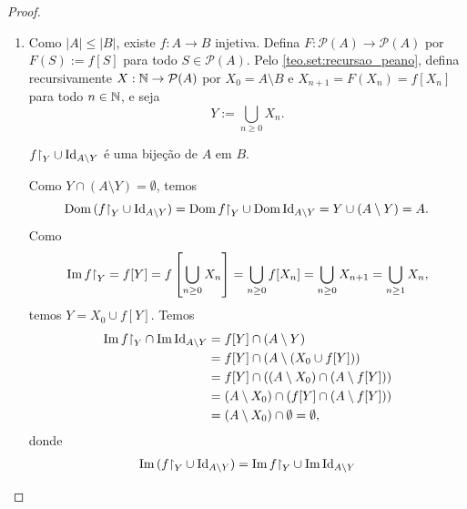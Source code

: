 \begin{proof}
    \leavevmode
        \begin{enumerate}[leftmargin=*, align=left, label=\textbf{(\alph*)}]
            \item Como $|A| \leq |B|$, existe $f : A \to B$ injetiva. Defina $F : \mathcal{P}(A) \to \mathcal{P}(A)$ por $F(S) := f[S]$ para todo $S \in \mathcal{P}(A)$. Pelo \cref{teo.set:recursao_peano}, defina recursivamente $X : \mathbb{N} \to \mathcal{P}(A)$ por $X_0 = A \setminus B$ e $X_{n+1} = F(X_n) = f[X_n]$ para todo $n \in \mathbb{N}$, e seja
                \[
                    Y := \bigcup_{n \geq 0} X_n.
                \]
                \begin{claim}
                    $f \restriction_Y \cup \id_{A \setminus Y}$ é uma bijeção de $A$ em $B$.
                \end{claim}
                \begin{midproof}
                    Como $Y \cap (A \setminus Y) = \emptyset$, temos 
                        \[
                            \Dom \, (f \restriction_Y \cup \id_{A \setminus Y}) = \Dom f \restriction_Y \cup \Dom \id_{A \setminus Y} = Y \cup (A \setminus Y) = A.
                        \]
                    Como
                        \[
                            \Img f \restriction_Y = f[Y] = f \left[ \bigcup_{n \geq 0} X_n \right] = \bigcup_{n \geq 0} f[X_n] = \bigcup_{n \geq 0} X_{n+1} = \bigcup_{n \geq 1} X_n,
                        \]
                    temos $Y = X_0 \cup f[Y]$. Temos
                        \begin{align*}
                            \Img f \restriction_Y \cap \Img \id_{A \setminus Y} &= f[Y] \cap (A \setminus Y) \\
                            &= f[Y] \cap (A \setminus (X_0 \cup f[Y])) \\
                            &= f[Y] \cap ( (A \setminus X_0) \cap (A \setminus f[Y]) ) \\
                            &= (A \setminus X_0) \cap (f[Y] \cap (A \setminus f[Y])) \\
                            &= (A \setminus X_0) \cap \emptyset = \emptyset,
                        \end{align*}
                    donde
                        \begin{align*}
                            \Img \, (f \restriction_Y \cup \id_{A \setminus Y}) &= \Img f \restriction_Y \cup \Img \id_{A \setminus Y} \\

\end{align*}
\end{midproof}
\end{enumerate}
\end{proof}
